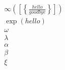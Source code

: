 \documentclass{article}
\theoremstyle{definition}
\newcommand{\w}{\omega}
\newcommand{\lam}{\lambda}
\newcommand{\al}{\alpha}
\newcommand{\be}{\beta}
\newcommand{\x}{\xi}
\newcommand{\f}[2]{\frac{#1}{#2}}
\newcommand{\ift}{\infty}
\newcommand{\lp}{\left(}
\newcommand{\rp}{\right)}
\newcommand{\lb}{\left[}
\newcommand{\rb}{\right]}
\newcommand{\lc}{\left\{}
\newcommand{\rc}{\right\}}
\begin{document}
\begin{align}
\ift\lp \lb\lc\f{hello}{goodbye}\rc\rb \rp \\
\exp(hello)\\
\w\\
\lam\\
\al\\
\be\\
\x
\end{align}
\end{document}

